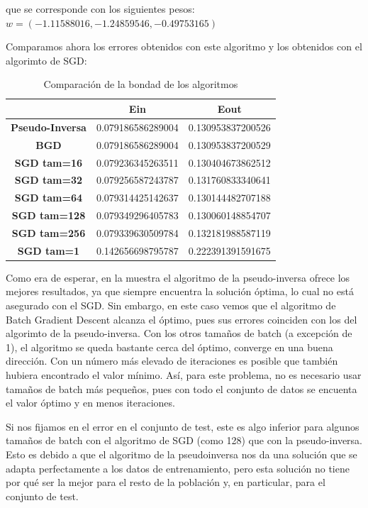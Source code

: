 \documentclass[a4]{article}
\begin{document}
que se corresponde con los siguientes pesos: $w=(-1.11588016, -1.24859546, -0.49753165)$

Comparamos ahora los errores obtenidos con este algoritmo y los obtenidos con el algorimto de SGD: 

\begin{table}[htbp]
	\centering
	\caption{Comparación de la bondad de los algoritmos}
	\begin{tabular}{|c|c|c|}
		\hline
		& \textbf{Ein} & \textbf{Eout} \\ \hline
		\textbf{Pseudo-Inversa} & 0.079186586289004 & 0.130953837200526 \\ \hline
		\textbf{BGD} & 0.079186586289004 & 0.130953837200529 \\ \hline
		\textbf{SGD tam=16} & 0.079236345263511 & 0.130404673862512 \\ \hline
		\textbf{SGD tam=32} & 0.079256587243787 & 0.131760833340641 \\ \hline
		\textbf{SGD tam=64} & 0.079314425142637 & 0.130144482707188 \\ \hline
		\textbf{SGD tam=128} & 0.079349296405783 & 0.130060148854707 \\ \hline
		\textbf{SGD tam=256} & 0.079339630509784 & 0.132181988587119 \\ \hline
		\textbf{SGD tam=1} & 0.142656698795787 & 0.222391391591675 \\ \hline
	\end{tabular}
	\label{}
\end{table}

\vspace{-2mm}

Como era de esperar, en la muestra el algoritmo de la pseudo-inversa ofrece los mejores resultados, ya que siempre encuentra la solución óptima, lo cual no está asegurado con el SGD. Sin embargo, en este caso vemos que el algoritmo de Batch Gradient Descent alcanza el óptimo, pues sus errores coinciden con los del algorimto de la pseudo-inversa. Con los otros tamaños de batch (a excepción de 1), el algoritmo se queda bastante cerca del óptimo, converge en una buena dirección. Con un número más elevado de iteraciones es posible que también hubiera encontrado el valor mínimo. Así, para este problema, no es necesario usar tamaños de batch más pequeños, pues con todo el conjunto de datos se encuenta el valor óptimo y en menos iteraciones.

Si nos fijamos en el error en el conjunto de test, este es algo inferior para algunos tamaños de batch con el algoritmo de SGD (como 128) que con la pseudo-inversa. Esto es debido a que el algoritmo de la pseudoinversa nos da una solución que se adapta perfectamente a los datos de entrenamiento, pero esta solución no tiene por qué ser la mejor para el resto de la población y, en particular, para el conjunto de test. 
\end{document}
